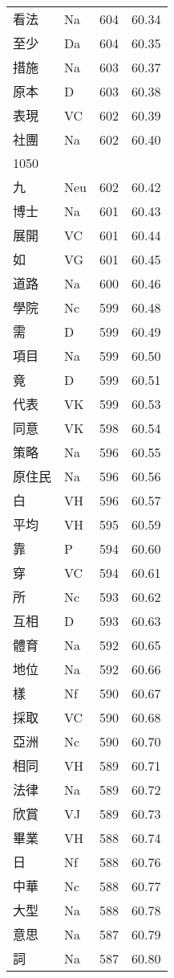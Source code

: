\documentclass[twocolumn]{book}
\begin{document}
\begin{supertabular}{llrr}
看法 & Na & 604 &  60.34\\
至少 & Da & 604 &  60.35\\
措施 & Na & 603 &  60.37\\
原本 & D & 603 &  60.38\\
表現 & VC & 602 &  60.39\\
社團 & Na & 602 &  60.40\\
1050\\
九 & Neu & 602 &  60.42\\
博士 & Na & 601 &  60.43\\
展開 & VC & 601 &  60.44\\
如 & VG & 601 &  60.45\\
道路 & Na & 600 &  60.46\\
學院 & Nc & 599 &  60.48\\
需 & D & 599 &  60.49\\
項目 & Na & 599 &  60.50\\
竟 & D & 599 &  60.51\\
代表 & VK & 599 &  60.53\\
同意 & VK & 598 &  60.54\\
策略 & Na & 596 &  60.55\\
原住民 & Na & 596 &  60.56\\
白 & VH & 596 &  60.57\\
平均 & VH & 595 &  60.59\\
靠 & P & 594 &  60.60\\
穿 & VC & 594 &  60.61\\
所 & Nc & 593 &  60.62\\
互相 & D & 593 &  60.63\\
體育 & Na & 592 &  60.65\\
地位 & Na & 592 &  60.66\\
樣 & Nf & 590 &  60.67\\
採取 & VC & 590 &  60.68\\
亞洲 & Nc & 590 &  60.70\\
相同 & VH & 589 &  60.71\\
法律 & Na & 589 &  60.72\\
欣賞 & VJ & 589 &  60.73\\
畢業 & VH & 588 &  60.74\\
日 & Nf & 588 &  60.76\\
中華 & Nc & 588 &  60.77\\
大型 & Na & 588 &  60.78\\
意思 & Na & 587 &  60.79\\
詞 & Na & 587 &  60.80\\

\end{supertabular}
\end{document}

